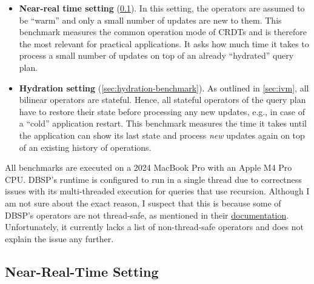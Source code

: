 \begin{itemize}
	\item \textbf{Near-real time setting} (\ref{sec:near-real-time-benchmark}).
	      In this setting, the operators are assumed to be ``warm'' and only
	      a small number of updates are new to them.
	      This benchmark measures the common operation mode of \acp{CRDT} and
	      is therefore the most relevant for practical applications. It asks
	      how much time it takes to process a small number of updates on top of
	      an already ``hydrated'' query plan.
	\item \textbf{Hydration setting} (\ref{sec:hydration-benchmark}).
	      As outlined in \ref{sec:ivm}, all bilinear operators are stateful.
	      Hence, all stateful operators of the query plan have to restore
	      their state before processing any new updates, e.g., in case of a
		  ``cold'' application restart. This benchmark measures the time it takes
	      until the application can show its last state and process \emph{new}
		  updates again on top of an existing history of operations.
\end{itemize}

All benchmarks are executed on a 2024 MacBook Pro with an Apple M4 Pro CPU.
DBSP's runtime is configured to run in a single thread due to correctness
issues with its multi-threaded execution for queries that use recursion.
Although I am not sure about the exact reason,
I suspect that this is because some of DBSP's operators are not thread-safe,
as mentioned in their
\href{https://docs.rs/dbsp/0.64.0/dbsp/circuit/struct.Runtime.html\#method.init_circuit}{documentation}.
Unfortunately, it currently lacks a list of non-thread-safe operators
and does not explain the issue any further\footnotemark{}.


\subsection{Near-Real-Time Setting}\label{sec:near-real-time-benchmark}



